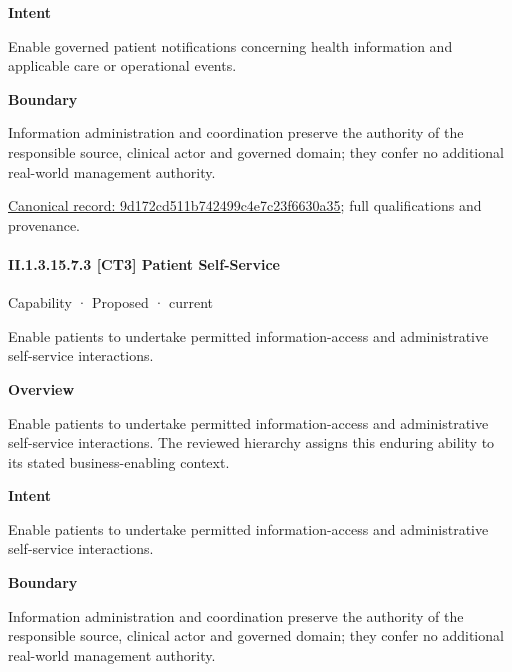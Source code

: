 \textbf{Intent}



Enable governed patient notifications concerning health information and applicable care or operational events.



\textbf{Boundary}



Information administration and coordination preserve the authority of the responsible source, clinical actor and governed domain; they confer no additional real-world management authority.


{\footnotesize \href{../../../../continuum/strategy/capability/9d172cd511b742499c4e7c23f6630a35.md}{Canonical record: 9d172cd511b742499c4e7c23f6630a35}; full qualifications and provenance.}\par
\paragraph*{II.1.3.15.7.3 [CT3] Patient Self-Service}
\label{navigation:II.1.3.15.7.3}

\label{element:d4956cab8b2b46c396899949c9486a1c}
{\small Capability · Proposed · current}\par

Enable patients to undertake permitted information-access and administrative self-service interactions.



\textbf{Overview}



Enable patients to undertake permitted information-access and administrative self-service interactions. The reviewed hierarchy assigns this enduring ability to its stated business-enabling context.



\textbf{Intent}



Enable patients to undertake permitted information-access and administrative self-service interactions.



\textbf{Boundary}



Information administration and coordination preserve the authority of the responsible source, clinical actor and governed domain; they confer no additional real-world management authority.


